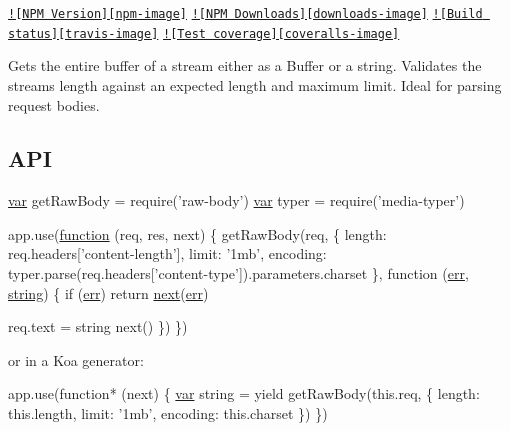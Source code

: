\href{https://npmjs.org/package/raw-body}{\tt !\mbox{[}N\+P\+M Version\mbox{]}\mbox{[}npm-\/image\mbox{]}} \href{https://npmjs.org/package/raw-body}{\tt !\mbox{[}N\+P\+M Downloads\mbox{]}\mbox{[}downloads-\/image\mbox{]}} \href{https://travis-ci.org/stream-utils/raw-body}{\tt !\mbox{[}Build status\mbox{]}\mbox{[}travis-\/image\mbox{]}} \href{https://coveralls.io/r/stream-utils/raw-body?branch=master}{\tt !\mbox{[}Test coverage\mbox{]}\mbox{[}coveralls-\/image\mbox{]}}

Gets the entire buffer of a stream either as a {\ttfamily Buffer} or a string. Validates the stream\textquotesingle{}s length against an expected length and maximum limit. Ideal for parsing request bodies.

\subsection*{A\+P\+I}


\begin{DoxyCode}
\hyperlink{018__def_8c_a335628f2e9085305224b4f9cc6e95ed5}{var} getRawBody = require(\textcolor{stringliteral}{'raw-body'})
\hyperlink{018__def_8c_a335628f2e9085305224b4f9cc6e95ed5}{var} typer      = require('media-typer')

app.use(\hyperlink{class_test_a51a683fa4fcec142ab1574e00a7b6860}{function} (req, res, next) \{
  getRawBody(req, \{
    length: req.headers[\textcolor{stringliteral}{'content-length'}],
    limit: \textcolor{stringliteral}{'1mb'},
    encoding: typer.parse(req.headers[\textcolor{stringliteral}{'content-type'}]).parameters.charset
  \}, \textcolor{keyword}{function} (\hyperlink{message_8cpp_aede5746344fdce99647541101eaa7f06}{err}, \hyperlink{tclscanner_8cpp_a3b18665bed369c4cf583afc1b05f583a}{string}) \{
    \textcolor{keywordflow}{if} (\hyperlink{message_8cpp_aede5746344fdce99647541101eaa7f06}{err})
      \textcolor{keywordflow}{return} \hyperlink{057__caller__graphs_8tcl_a3f808a00e1b937978455d707851ab33a}{next}(\hyperlink{message_8cpp_aede5746344fdce99647541101eaa7f06}{err})

    req.text = \textcolor{keywordtype}{string}
    next()
  \})
\})
\end{DoxyCode}


or in a Koa generator\+:


\begin{DoxyCode}
app.use(\textcolor{keyword}{function}* (next) \{
  \hyperlink{018__def_8c_a335628f2e9085305224b4f9cc6e95ed5}{var} \textcolor{keywordtype}{string} = yield getRawBody(this.req, \{
    length: this.length,
    limit: \textcolor{stringliteral}{'1mb'},
    encoding: this.charset
  \})
\})
\end{DoxyCode}


